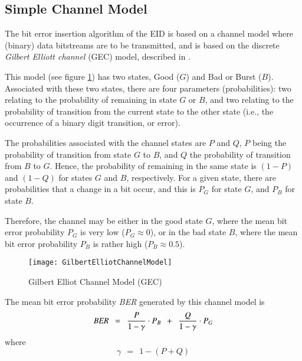 \subsection{Simple Channel Model}

The bit error insertion algorithm of the EID is based on a channel model
where (binary) data bitstreams are to be transmitted, and is based on the
discrete {\it Gilbert Elliott channel} (GEC) model, described in
\cite{GEC}.

This model (see figure \ref{GEC}) has two states, Good ($G$) and
Bad or Burst ($B$). Associated with these two states, there are four
parameters (probabilities): two relating to the probability of remaining
in state $G$ or $B$, and two relating to the probability of transition from
the current state to the other state (i.e., the occurrence of a
binary digit transition, or error).

The probabilities associated with the channel states are $P$ and $Q$, $P$
being the probability of transition from state $G$ to $B$, and $Q$ the
probability of transition from $B$ to $G$. Hence, the probability of
remaining in the same state is $(1-P)$ and $(1-Q)$ for states $G$ and $B$,
respectively. For a given state, there are probabilities that a change in
a bit occur, and this is $P_G$ for state $G$, and $P_B$ for state $B$.

Therefore, the channel may be either in the good state $G$, where the
mean bit error probability $P_G$ is very low ($P_G \approx 0$), or in
the bad state $B$, where the mean bit error probability $P_B$ is rather
high ($P_B \approx 0.5$). \\

\begin{figure}[hb]
    \begin{center}
        \texttt{[image: GilbertElliotChannelModel]}
    \end{center}
    \caption{{\label{GEC}} Gilbert Elliot Channel Model (GEC)}
\end{figure}

The mean bit error probability {\em BER} generated by this channel model is
\begin{equation} \label{EQ1}
                 \mbox{\em BER} \ \ =\ \ \frac{P}{1-\gamma}\cdot P_B \ \
                          +\ \ \frac{Q}{1-\gamma}\cdot P_G
\end{equation}
where
\begin{equation} \label{EQ2}
                           \gamma \ \ =\ \ 1-(P+Q)
\end{equation}

